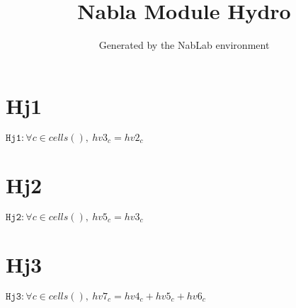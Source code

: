 \documentclass[11pt]{article}
\title{Nabla Module Hydro}
\author{Generated by the NabLab environment}
\begin{document}
\maketitle


\section{Hj1}
$\texttt{Hj1} : \forall{c\in cells()}, \ hv3_{c} = hv2_{c}$


\section{Hj2}
$\texttt{Hj2} : \forall{c\in cells()}, \ hv5_{c} = hv3_{c}$


\section{Hj3}
$\texttt{Hj3} : \forall{c\in cells()}, \ hv7_{c} = hv4_{c} + hv5_{c} + hv6_{c}$
\end{document}
